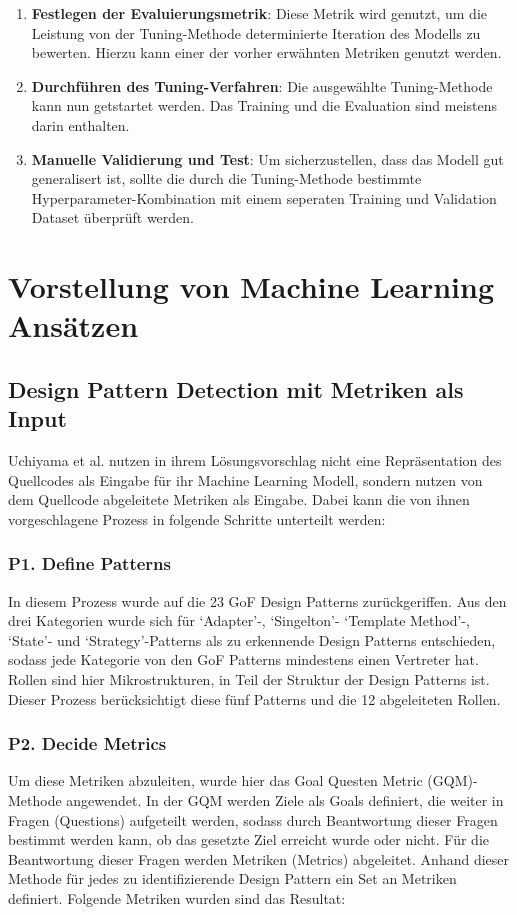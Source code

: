 \documentclass[conference]{IEEEtran}
\begin{document}
\begin{enumerate}
\begin{itemize}
          \end{itemize}
    \item \textbf{Festlegen der Evaluierungsmetrik}: Diese Metrik wird genutzt, um die Leistung von der Tuning-Methode determinierte Iteration des Modells zu bewerten. Hierzu kann einer der vorher erwähnten Metriken genutzt werden.
    \item \textbf{Durchführen des Tuning-Verfahren}: Die ausgewählte Tuning-Methode kann nun getstartet werden. Das Training und die Evaluation sind meistens darin enthalten.
    \item \textbf{Manuelle Validierung und Test}: Um sicherzustellen, dass das Modell gut generalisert ist, sollte die durch die Tuning-Methode bestimmte Hyperparameter-Kombination mit einem seperaten Training und Validation Dataset überprüft werden.
\end{enumerate}

\newpage

\section{Vorstellung von Machine Learning Ansätzen}

\subsection{Design Pattern Detection mit Metriken als Input}

Uchiyama et al. nutzen in ihrem Lösungsvorschlag nicht eine Repräsentation des Quellcodes als Eingabe für ihr Machine Learning Modell, sondern nutzen von dem Quellcode abgeleitete Metriken als Eingabe\cite{dodmetrics}.
Dabei kann die von ihnen vorgeschlagene Prozess in folgende Schritte unterteilt werden:


\subsubsection*{P1. Define Patterns}
In diesem Prozess wurde auf die 23 GoF Design Patterns zurückgeriffen. Aus den drei Kategorien wurde sich für `Adapter'-, `Singelton'- `Template Method'-, `State'- und `Strategy'-Patterns als zu erkennende Design Patterns entschieden, sodass jede Kategorie von den GoF Patterns mindestens einen Vertreter hat. Rollen sind hier Mikrostrukturen, in Teil der Struktur der Design Patterns ist. Dieser Prozess berücksichtigt diese fünf Patterns und die 12 abgeleiteten Rollen\cite[p. 4]{dodmetrics}.

\subsubsection*{P2. Decide Metrics}
Um diese Metriken abzuleiten, wurde hier das Goal Questen Metric (GQM)-Methode angewendet. In der GQM werden Ziele als Goals definiert, die weiter in Fragen (Questions) aufgeteilt werden, sodass durch Beantwortung dieser Fragen bestimmt werden kann, ob das gesetzte Ziel erreicht wurde oder nicht. Für die Beantwortung dieser Fragen werden Metriken (Metrics) abgeleitet. Anhand dieser Methode für jedes zu identifizierende Design Pattern ein Set an Metriken definiert.
Folgende Metriken wurden sind das Resultat:
\end{document}
